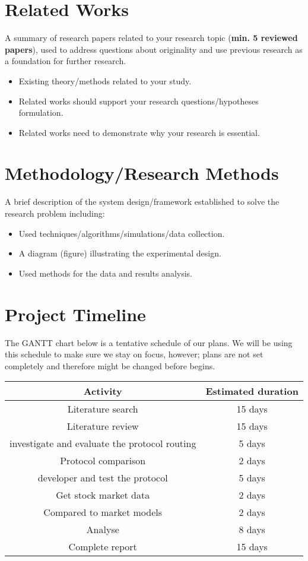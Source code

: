 \documentclass[paper=a4, fontsize=11pt]{scrartcl}
\numberwithin{equation}{section}		%
\numberwithin{figure}{section}			%
\numberwithin{table}{section}				%
\begin{document}
\section{Related Works}
A summary of research papers related to your research topic (\textbf{min. 5 reviewed papers}), used to address questions about originality and use previous research as a foundation for further research.
\begin{itemize}
    \item Existing theory/methods related to your study. 
    \item Related works should support your research questions/hypotheses formulation.
    \item Related works need to demonstrate why your research is essential.
\end{itemize}

\section{Methodology/Research Methods}
A brief description of the system design/framework established to solve the research problem including:
\begin{itemize}
    \item Used techniques/algorithms/simulations/data collection.
    \item A diagram (figure) illustrating the experimental design. 
    \item Used methods for the data and results analysis.
\end{itemize}

\section{Project Timeline}
 The GANTT chart below is a tentative schedule of our plans. We will be using this schedule to make sure we stay on focus, however; plans are not set completely and therefore might be changed before begins.
 \begin{center}
 \begin{tabular}{||c c ||} 
 \hline
 Activity  & Estimated duration  \\ [1ex] 
 \hline\hline
 Literature search & 15 days       \\ [1ex]
 \hline
 Literature review & 15 days      \\[1ex]
 \hline
investigate and evaluate the protocol routing & 5 days  \\[1ex]
 \hline
 Protocol comparison & 2 days  \\[1ex]
 \hline
 developer and test the protocol & 5 days  \\ [1ex] 
 \hline
 \hline
 Get stock market data & 2 days  \\ [1ex] 
 \hline
 \hline
 Compared to market models & 2 days  \\ [1ex] 
 \hline
 \hline
 Analyse & 8 days  \\ [1ex] 
 \hline
 \hline
 Complete report & 15 days  \\ [1ex]
 \hline
 
\end{tabular}
\end{center}

\pagebreak


\end{document}
